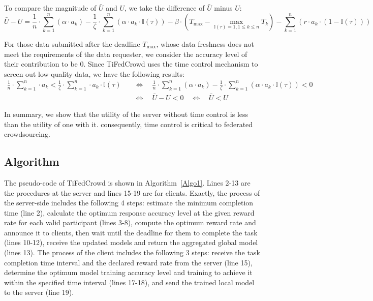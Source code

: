 \documentclass[final,1p,times]{elsarticle}
\begin{document}
To compare the magnitude of $\bar{U}$ and $U$, we take the difference of $\bar{U}$ minus $U$:
\begin{equation}
	\bar{U} -U = \frac{1}{n}\cdot \sum_{k=1}^n(\alpha\cdot a_k)-\frac{1}{\zeta}\cdot \sum_{k=1}^n(\alpha\cdot a_k\cdot \mathbb{I}(\tau))- \beta\cdot(T_{\max}-\max_{\mathbb{I}(\tau)=1,1\le k\le n}T_k) - \sum_{k=1}^n(r\cdot a_k\cdot (1-\mathbb{I}(\tau)))
\end{equation}

For those data submitted after the deadline $T_{\max}$, whose data freshness does not meet the requirements of the data requester, we consider the accuracy level of their contribution to be $0$. Since TiFedCrowd uses the time control mechanism to screen out low-quality data, we have the following results:
\begin{equation}
	\begin{aligned}
		\frac{1}{n}\cdot \sum_{k=1}^n\cdot a_k < \frac{1}{\zeta}\cdot \sum_{k=1}^n\cdot a_k\cdot \mathbb{I}(\tau)\quad
		&\Leftrightarrow\quad \frac{1}{n}\cdot \sum_{k=1}^n(\alpha\cdot a_k)-\frac{1}{\zeta}\cdot \sum_{k=1}^n(\alpha\cdot a_k\cdot \mathbb{I}(\tau))<0\\&\Leftrightarrow\quad  \bar{U} -U<0\quad\Leftrightarrow\quad  \bar{U} < U
	\end{aligned}
\end{equation}	

In summary, we show that the utility of the server without time control is less than the utility of one with it. consequently, time control is critical to federated crowdsourcing.
\subsection{Algorithm}
The pseudo-code of TiFedCrowd is shown in Algorithm~\ref{Algo1}. Lines 2-13 are the procedures at the server and lines 15-19 are for clients. Exactly, the process of the server-side includes the following 4 steps: estimate the minimum completion time (line 2), calculate the optimum response accuracy level at the given reward rate for each valid participant (lines 3-8), compute the optimum reward rate and announce it to clients, then wait until the deadline for them to complete the task (lines 10-12), receive the updated models and return the aggregated global model (lines 13).
The process of the client includes the following 3 steps: receive
the task completion time interval and the declared reward rate from the server (line 15), determine the optimum model training accuracy level and training to achieve it within the specified time interval (lines 17-18), and send the trained local model to the server (line 19). 
\end{document}
